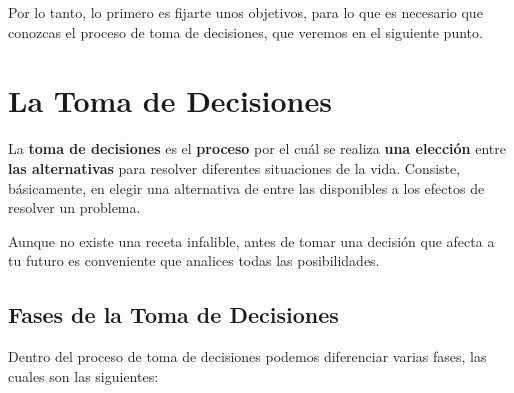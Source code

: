 Por lo tanto, lo primero es fijarte unos objetivos, para lo que es necesario que conozcas el proceso de toma de decisiones, que veremos en el siguiente punto.

\section{La Toma de Decisiones}
La \textbf{toma de decisiones} es el \textbf{proceso} por el cuál se realiza \textbf{una elección} entre \textbf{las alternativas} para resolver diferentes situaciones de la vida. Consiste, básicamente, en elegir una alternativa de entre las disponibles a los efectos de resolver un problema.

Aunque no existe una receta infalible, antes de tomar una decisión que afecta a tu futuro es conveniente que analices todas las posibilidades.

\subsection{Fases de la Toma de Decisiones}
Dentro del proceso de toma de decisiones podemos diferenciar varias fases, las cuales son las siguientes:

